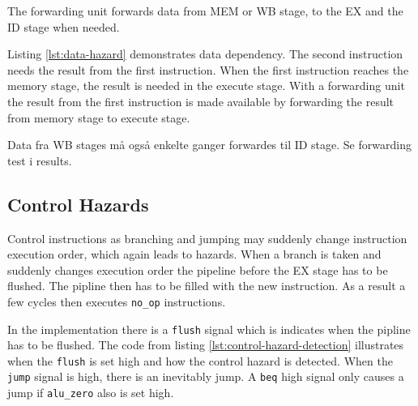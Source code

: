 The forwarding unit forwards data from MEM or WB stage, to the EX and the ID stage when needed.

Listing \ref{lst:data-hazard} demonstrates data dependency.
The second instruction needs the result from the first instruction.
When the first instruction reaches the memory stage, the result is needed in the execute stage.
With a forwarding unit the result from the first instruction is made available by forwarding the result from memory stage to execute stage.

Data fra WB stages må også enkelte ganger forwardes til ID stage. Se forwarding test i results.


\subsection{Control Hazards}
Control instructions as branching and jumping may suddenly change instruction execution order,
which again leads to hazards.
When a branch is taken and suddenly changes execution order the pipeline before the EX stage has to be flushed.
The pipline then has to be filled with the new instruction.
As a result a few cycles then executes \texttt{no\_op} instructions.

In the implementation there is a \texttt{flush} signal which is indicates when the pipline has to be flushed.
The code from listing \ref{lst:control-hazard-detection} illustrates when the \texttt{flush} is set high and how the control hazard is detected.
When the \texttt{jump} signal is high, there is an inevitably jump.
A \texttt{beq} high signal only causes a jump if \texttt{alu\_zero} also is set high.

